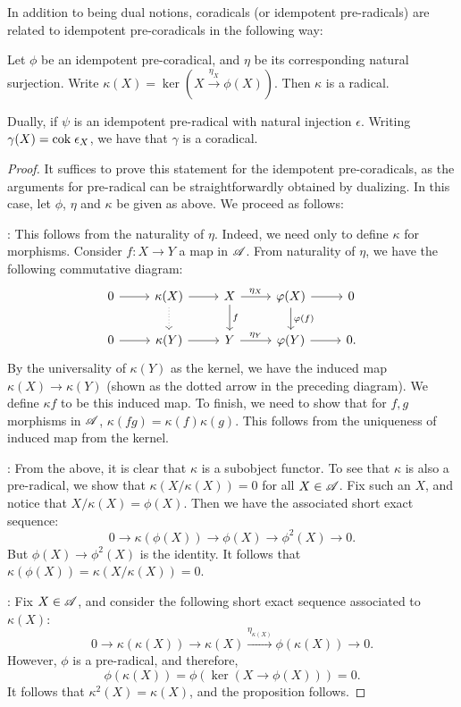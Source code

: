 In addition to being dual notions, coradicals (or idempotent 
pre-radicals) are related to idempotent pre-coradicals in the
following way:

\begin{prop}\label{prop_rad_eq_corad}
Let $\phi$ be an idempotent pre-coradical, and $\eta$ be its 
corresponding natural surjection. Write $\kappa(X) = \ker (X 
\stackrel{\eta_X}{\to} \phi(X))$. Then $\kappa$ is a radical.

Dually, if $\psi$ is an idempotent pre-radical with natural 
injection $\epsilon$. Writing $\gamma(X) = \mathrm{cok}\; \epsilon_X$, we 
have that $\gamma$ is a coradical.
\end{prop}
\begin{proof}
It suffices to prove this statement for the idempotent 
pre-coradicals, as the arguments for pre-radical can be 
straightforwardly obtained by dualizing. In this case, let $\phi$, 
$\eta$ and $\kappa$ be given as above. We proceed as follows:

: This follows from the naturality 
of $\eta$. Indeed, we need only to define $\kappa$ for morphisms. 
Consider $f: X \to Y$ a map in $\mathscr{A}$. From naturality of 
$\eta$, we have the following commutative diagram:
\[
\begin{tikzcd}
0 \arrow{r} &
\kappa(X) \arrow{r} \arrow[dotted]{d} &
X \arrow{r}{\eta_X} \arrow{d}{f} &
\phi(X) \arrow{r} \arrow{d}{\phi(f)} &
0 \\
0 \arrow{r} &
\kappa(Y) \arrow{r} &
Y \arrow{r}{\eta_Y} &
\phi(Y) \arrow{r} &
0.
\end{tikzcd}
\]
By the universality of $\kappa(Y)$ as the kernel, we have the 
induced map $\kappa(X) \to \kappa(Y)$ (shown as the dotted arrow 
in the preceding diagram). We define $\kappa f$ to be this induced
map. To finish, we need to show that for $f, g$ morphisms in 
$\mathscr{A}$, $\kappa(fg) = \kappa(f)\kappa(g)$. This follows from
the uniqueness of induced map from the kernel.

: From the above, it is clear 
that $\kappa$ is a subobject functor. To see that $\kappa$ is also
a pre-radical, we show that $\kappa(X/\kappa(X)) = 0$ for all $X 
\in \mathscr{A}$. Fix such an $X$, and notice that $X/\kappa(X) = 
\phi(X)$. Then we have the associated short exact sequence:
\[
0 \to \kappa(\phi(X)) \to \phi(X) \to \phi^2(X) \to 0.
\]
But $\phi(X) \to \phi^2(X)$ is the identity. It follows that 
$\kappa(\phi(X)) = \kappa(X/\kappa(X)) = 0$.

: Fix $X \in \mathscr{A}$, and consider
the following short exact sequence associated to $\kappa(X)$:
\[
0 \to \kappa(\kappa(X)) \to \kappa(X) 
   \stackrel{\eta_{\kappa(X)}}{\to} \phi(\kappa(X)) \to 0.
\]
However, $\phi$ is a pre-radical, and therefore, 
\[
\phi(\kappa(X)) = \phi(\ker(X \to \phi(X))) = 0.
\]
It follows that $\kappa^2(X) = \kappa(X)$, and the proposition 
follows.
\end{proof}

